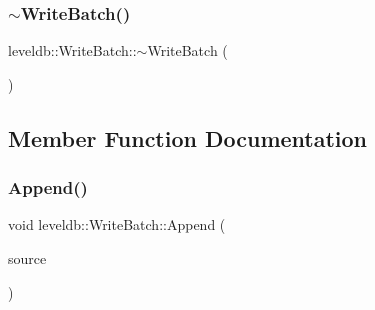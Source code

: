 \mbox{\label{classleveldb_1_1_write_batch_a5bc7decc31279f2457839b30ad8daca5}} 
\subsubsection{\texorpdfstring{$\sim$WriteBatch()}{~WriteBatch()}}
{\footnotesize\ttfamily leveldb\+::\+Write\+Batch\+::$\sim$\+Write\+Batch (\begin{DoxyParamCaption}{ }\end{DoxyParamCaption})}



\subsection{Member Function Documentation}
\mbox{\label{classleveldb_1_1_write_batch_a90424a9947fb7501eec2c31acf96e27f}} 
\subsubsection{\texorpdfstring{Append()}{Append()}}
{\footnotesize\ttfamily void leveldb\+::\+Write\+Batch\+::\+Append (\begin{DoxyParamCaption}\item[{const \mbox{\hyperlink{classleveldb_1_1_write_batch}{Write\+Batch}} \&}]{source }\end{DoxyParamCaption})}

